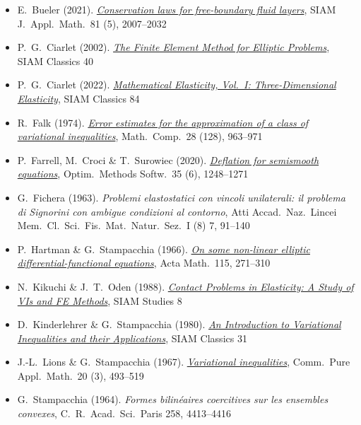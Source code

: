 \let\plainhref\href
\renewcommand{\href}[2]{\plainhref{#1}{\textcolor{icBlue}{#2}}}

\setlength{\leftmargini}{1em}  %
\begin{itemize}\setlength{\itemsep}{2pt}
\footnotesize
\item E.~Bueler (2021). \href{https://doi.org/10.1137/20M135217X}{\emph{Conservation laws for free-boundary fluid layers}}, SIAM J.~Appl.~Math.~81 (5), 2007--2032
\item P.~G.~Ciarlet (2002). \href{https://doi.org/10.1137/1.9780898719208}{\emph{The Finite Element Method for Elliptic Problems}}, SIAM Classics 40
\item P.~G.~Ciarlet (2022). \href{https://doi.org/10.1137/1.9781611976786}{\emph{Mathematical Elasticity, Vol.~I: Three-Dimensional Elasticity}}, SIAM Classics 84
\item R.~Falk (1974).  \href{https://doi.org/10.1090/S0025-5718-1974-0391502-8}{\emph{Error estimates for the approximation of a class of variational inequalities}}, Math.~Comp.~28 (128), 963--971
\item P.~Farrell, M.~Croci \& T.~Surowiec (2020). \href{https://doi.org/10.1080/10556788.2019.1613655}{\emph{Deflation for semismooth equations}}, Optim.~Methods Softw.~35 (6), 1248--1271
\item G.~Fichera (1963). \emph{Problemi elastostatici con vincoli unilaterali: il problema di {S}ignorini con ambigue condizioni al contorno}, Atti Accad.~Naz.~Lincei Mem.~Cl.~Sci.~Fis.~Mat.~Natur.~Sez.~I (8) 7, 91--140
\item P.~Hartman \& G.~Stampacchia (1966). \href{https://doi.org/10.1007/BF02392210}{\emph{On some non-linear elliptic differential-functional equations}}, Acta Math.~115, 271--310
\item N.~Kikuchi \& J.~T.~Oden (1988). \href{https://doi.org/10.1137/1.9781611970845}{\emph{Contact Problems in Elasticity: A Study of VIs and FE Methods}}, SIAM Studies 8
\item D.~Kinderlehrer \& G.~Stampacchia (1980). \href{https://doi.org/10.1137/1.9780898719451}{\emph{An Introduction to Variational Inequalities and their Applications}}, SIAM Classics 31
\item J.-L.~Lions \& G.~Stampacchia (1967). \href{https://doi.org/10.1002/cpa.3160200302}{\emph{Variational inequalities}}, Comm.~Pure Appl.~Math.~20 (3), 493--519
\item G.~Stampacchia (1964). \emph{Formes bilin\'eaires coercitives sur les ensembles convexes}, C.~R.~Acad.~Sci.~Paris 258, 4413--4416
\end{itemize}
